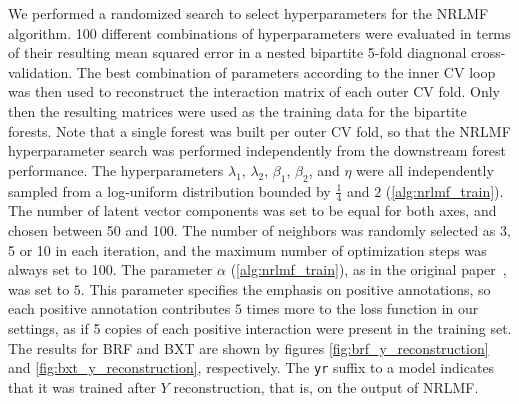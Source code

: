 We performed a randomized search to select hyperparameters for the NRLMF algorithm. 100 different combinations of hyperparameters were evaluated
in terms of their resulting mean squared error in a nested bipartite 5-fold diagnonal cross-validation.
The best combination of parameters according to the inner CV loop was then used to reconstruct the interaction matrix of each outer CV fold. Only then the resulting matrices were used as the training data for the bipartite forests. Note that a single forest was built per outer CV fold, so that the NRLMF hyperparameter search was performed independently from the downstream forest performance.
The hyperparameters $\lambda_1$, $\lambda_2$, $\beta_1$, $\beta_2$, and $\eta$ were all independently sampled from a log-uniform distribution bounded by $\frac{1}{4}$ and $2$ (\autoref{alg:nrlmf_train}).
The number of latent vector components was set to be equal for both axes, and chosen between 50 and 100. The number of neighbors was randomly selected as 3, 5 or 10 in each iteration, and the maximum number of optimization steps was always set to 100. The parameter $\alpha$ (\autoref{alg:nrlmf_train}), as in the original paper~\cite{liu2016neighborhood}, was set to $5$. This parameter specifies the emphasis on positive annotations, so each positive annotation contributes $5$ times more to the loss function in our settings, as if 5 copies of each positive interaction were present in the training set.
%
%
The results for BRF and BXT are shown by figures \ref{fig:brf_y_reconstruction} and \ref{fig:bxt_y_reconstruction}, respectively. The \texttt{yr} suffix to a model indicates that it was trained after $Y$ reconstruction, that is, on the output of NRLMF.

